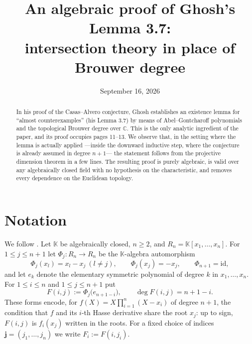 \documentclass[11pt,reqno]{amsart}
\title[An algebraic proof of Ghosh's Lemma 3.7]
      {An algebraic proof of Ghosh's Lemma 3.7:\\
       intersection theory in place of Brouwer degree}
\author{}
\date{September 16, 2026}
\theoremstyle{plain}
\theoremstyle{definition}
\newcommand{\KK}{\mathbb{K}}
\newcommand{\bj}{\mathbf{j}}
\begin{document}
\begin{abstract}
In his proof of the Casas--Alvero conjecture, Ghosh \cite{Gho} establishes an
existence lemma for ``almost counterexamples'' (his Lemma 3.7) by means of
Abel--Gontcharoff polynomials and the topological Brouwer degree over
$\mathbb{C}$. This is the only analytic ingredient of the paper, and its proof
occupies pages 11--13. We observe that, in the setting where the lemma is
actually applied ---inside the downward inductive step, where the conjecture is
already assumed in degree $n+1$--- the statement follows from the projective
dimension theorem in a few lines. The resulting proof is purely algebraic, is
valid over any algebraically closed field with no hypothesis on the
characteristic, and removes every dependence on the Euclidean topology.
\end{abstract}

\maketitle

\begin{center}\small
{}
\end{center}

\section{Notation}

We follow \cite{Gho}. Let $\KK$ be algebraically closed, $n\ge2$, and
$R_n=\KK[x_1,\dots,x_n]$. For $1\le j\le n+1$ let $\Phi_j\colon R_n\to R_n$ be
the $\KK$-algebra automorphism
\[
  \Phi_j(x_l)=x_l-x_j\ (l\neq j),\qquad \Phi_j(x_j)=-x_j,
  \qquad \Phi_{n+1}=\mathrm{id},
\]
and let $e_k$ denote the elementary symmetric polynomial of degree $k$ in
$x_1,\dots,x_n$. For $1\le i\le n$ and $1\le j\le n+1$ put
\[
  F(i,j):=\Phi_j\big(e_{n+1-i}\big),
  \qquad \deg F(i,j)=n+1-i .
\]
These forms encode, for $f(X)=X\prod_{i=1}^n(X-x_i)$ of degree $n+1$, the
condition that $f$ and its $i$-th Hasse derivative share the root $x_j$: up to
sign, $F(i,j)$ is $f_i(x_j)$ written in the roots. For a fixed choice of indices
$\bj=(j_1,\dots,j_n)$ we write $F_i:=F(i,j_i)$.
\end{document}
